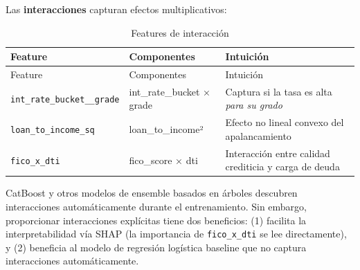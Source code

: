 \documentclass[
  spanish,
  11pt,
  letterpaper,
]{scrbook}
\theoremstyle{plain}
\theoremstyle{remark}
\begin{document}
Las \textbf{interacciones} capturan efectos multiplicativos:

\begin{longtable}[]{@{}
  >{\raggedright\arraybackslash}p{}
  >{\raggedright\arraybackslash}p{}
  >{\raggedright\arraybackslash}p{}@{}}
\caption{Features de
interacción}\label{tbl-interaction-features}\tabularnewline
\toprule\noalign{}
\begin{minipage}[b]{\linewidth}\raggedright
Feature
\end{minipage} & \begin{minipage}[b]{\linewidth}\raggedright
Componentes
\end{minipage} & \begin{minipage}[b]{\linewidth}\raggedright
Intuición
\end{minipage} \\
\midrule\noalign{}
\endfirsthead
\toprule\noalign{}
\begin{minipage}[b]{\linewidth}\raggedright
Feature
\end{minipage} & \begin{minipage}[b]{\linewidth}\raggedright
Componentes
\end{minipage} & \begin{minipage}[b]{\linewidth}\raggedright
Intuición
\end{minipage} \\
\midrule\noalign{}
\endhead
\bottomrule\noalign{}
\endlastfoot
\texttt{int\_rate\_bucket\_\_grade} & int\_rate\_bucket × grade &
Captura si la tasa es alta \emph{para su grado} \\
\texttt{loan\_to\_income\_sq} & loan\_to\_income² & Efecto no lineal
convexo del apalancamiento \\
\texttt{fico\_x\_dti} & fico\_score × dti & Interacción entre calidad
crediticia y carga de deuda \\
\end{longtable}

\begin{tcolorbox}[enhanced jigsaw, arc=.35mm, bottomrule=.15mm, bottomtitle=1mm, breakable, colback=white, colbacktitle=quarto-callout-tip-color!10!white, colframe=quarto-callout-tip-color-frame, coltitle=black, left=2mm, leftrule=.75mm, opacityback=0, opacitybacktitle=0.6, rightrule=.15mm, title=\textcolor{quarto-callout-tip-color}{\faLightbulb}\hspace{0.5em}{¿Son necesarias las interacciones para CatBoost?}, titlerule=0mm, toprule=.15mm, toptitle=1mm]

CatBoost y otros modelos de ensemble basados en árboles descubren
interacciones automáticamente durante el entrenamiento. Sin embargo,
proporcionar interacciones explícitas tiene dos beneficios: (1) facilita
la interpretabilidad vía SHAP (la importancia de \texttt{fico\_x\_dti}
se lee directamente), y (2) beneficia al modelo de regresión logística
baseline que no captura interacciones automáticamente.

\end{tcolorbox}
\end{document}
